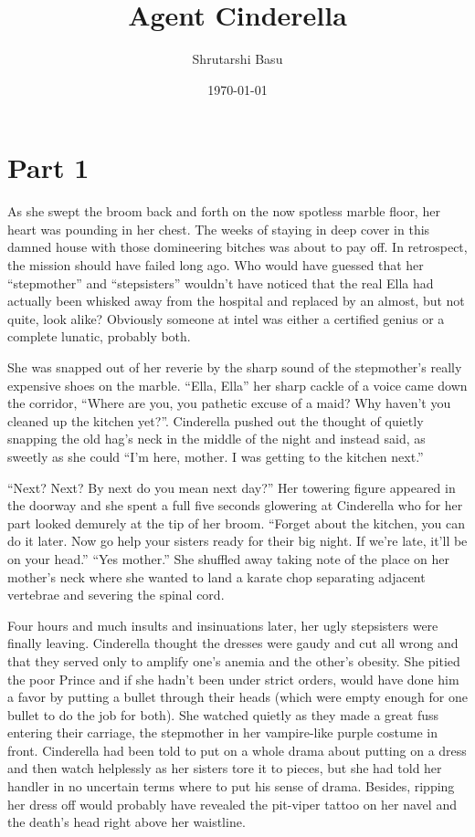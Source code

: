 \documentclass[12pt,letterpaper]{article}
\title{Agent Cinderella}
\author{Shrutarshi Basu}
\date{\today}
\begin{document}
\maketitle
\doublespacing

\section*{Part 1}

As she swept the broom back and forth on the now spotless marble floor, her heart was pounding in her chest. The weeks of staying in deep cover in this damned house with those domineering bitches was about to pay off. In retrospect, the mission should have failed long ago. Who would have guessed that her ``stepmother'' and ``stepsisters'' wouldn't have noticed that the real Ella had actually been whisked away from the hospital and replaced by an almost, but not quite, look alike? Obviously someone at intel was either a certified genius or a complete lunatic, probably both.

She was snapped out of her reverie by the sharp sound of the stepmother's really expensive shoes on the marble. ``Ella, Ella'' her sharp cackle of a voice came down the corridor, ``Where are you, you pathetic excuse of a maid? Why haven't you cleaned up the kitchen yet?''. Cinderella pushed out the thought of quietly snapping the old hag's neck in the middle of the night and instead said, as sweetly as she could ``I'm here, mother. I was getting to the kitchen next.''

``Next? Next? By next do you mean next day?'' Her towering figure appeared in the doorway and she spent a full five seconds glowering at Cinderella who for her part looked demurely at the tip of her broom. ``Forget about the kitchen, you can do it later. Now go help your sisters ready for their big night. If we're late, it'll be on your head.'' ``Yes mother.'' She shuffled away taking note of the place on her mother's neck where she wanted to land a karate chop separating adjacent vertebrae and severing the spinal cord.

Four hours and much insults and insinuations later, her ugly stepsisters were finally leaving. Cinderella thought the dresses were gaudy and cut all wrong and that they served only to amplify one's anemia and the other's obesity. She pitied the poor Prince and if she hadn't been under strict orders, would have done him a favor by putting a bullet through their heads (which were empty enough for one bullet to do the job for both). She watched quietly as they made a great fuss entering their carriage, the stepmother in her vampire-like purple costume in front. Cinderella had been told to put on a whole drama about putting on a dress and then watch helplessly as her sisters tore it to pieces, but she had told her handler in no uncertain terms where to put his sense of drama. Besides, ripping her dress off would probably have revealed the pit-viper tattoo on her navel and the death's head right above her waistline.
\end{document}

